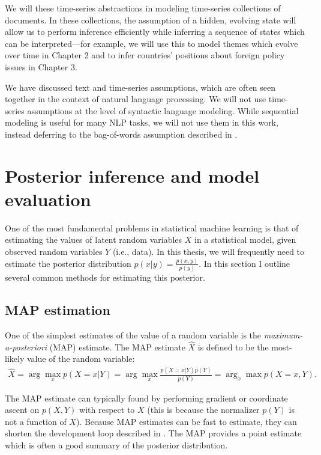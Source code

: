 We will these time-series abstractions in modeling time-series
collections of documents.  In these collections, the assumption of a
hidden, evolving state will allow us to perform inference efficiently
while inferring a sequence of states which can be interpreted---for
example, we will use this to model themes which evolve over time in
Chapter 2 and to infer countries' positions about foreign policy
issues in Chapter 3.

We have discussed text and time-series assumptions, which are often
seen together in the context of natural language processing.  We will
not use time-series assumptions at the level of syntactic language
modeling.  While sequential modeling is useful for many NLP tasks, we
will not use them in this work, instead deferring to the bag-of-words
assumption described in .


\section{Posterior inference and model evaluation}
One of the most fundamental problems in statistical machine learning
is that of estimating the values of latent random variables $X$ in a
statistical model, given observed random variables $Y$ (i.e., data).
In this thesis, we will frequently need to estimate the posterior distribution
$p(x | y) = \frac{p(x, y)}{p(y)}$.  In this section I outline
several common methods for estimating this posterior.

\subsection{MAP estimation}
One of the simplest estimates of the value of a random variable is the \emph{maximum-a-posteriori} (MAP) estimate.  The MAP estimate $\hat X$ is defined to be the most-likely value of the random variable:
\begin{align}
  \hat X = \arg \max_x p(X=x | Y) = \arg \max_x \frac{p(X=x | Y) p(Y)}{p(Y)} = \arg_x \max p(X=x, Y).
\end{align}

The MAP estimate can typically found by performing gradient or
coordinate ascent on $p(X, Y)$ with respect to $X$ (this is because
the normalizer $p(Y)$ is not a function of $X$).  Because MAP
estimates can be fast to estimate, they can shorten the development
loop described in . The MAP provides a point estimate
which is often a good summary of the posterior distribution.

